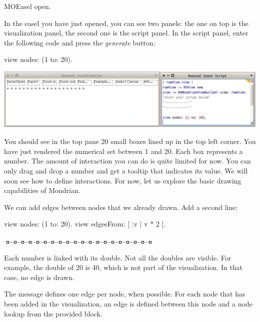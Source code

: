 \documentclass[a4paper,10pt,twoside]{book}
\begin{document}
\begin{code}{}
MOEasel open.
\end{code}


In the easel you have just opened, you can see two panels: the one on top is the visualization panel, the second one is the script panel. In the script panel, enter the following code and press the \emph{generate} button:

\begin{code}{}
view nodes: (1 to: 20).
\end{code}
\begin{center}\includegraphics[scale=0.45]{picture1}\end{center}

You should see in the top pane 20 small boxes lined up in the top left corner. You have just rendered the numerical set between 1 and 20. Each box represents a number. The amount of interaction you can do is quite limited for now. You can only drag and drop a number and get a tooltip that indicates its value. We will soon see how to define interactions. For now, let us explore the basic drawing capabilities of Mondrian.

We can add edges between nodes that we already drawn. Add a second line:

\begin{code}{}
view nodes: (1 to: 20).
view edgesFrom: [ :v | v * 2 ].
\end{code}
\begin{center}\includegraphics[scale=0.4]{picture2}\end{center}

Each number is linked with its double. Not all the doubles are visible. For example, the double of 20 is 40, which is not part of the visualization. In that case, no edge is drawn. 

The message  defines one edge per node, when possible. For each node that has been added in the visualization, an edge is defined between this node and a node lookup from the provided block.
\end{document}
